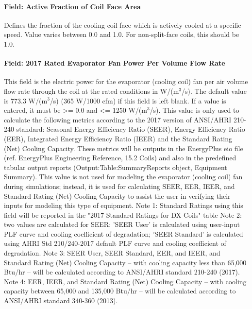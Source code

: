 \paragraph{Field: Active Fraction of Coil Face Area}\label{field-active-fraction-of-coil-face-area}

Defines the fraction of the cooling coil face which is actively cooled at a specific speed. Value varies between 0.0 and 1.0. For non-split-face coils, this should be 1.0.

\paragraph{Field: 2017 Rated Evaporator Fan Power Per Volume Flow Rate}

This field is the electric power for the evaporator (cooling coil) fan per air volume flow rate through the coil at the rated conditions in W/(m\(^{3}\)/s). The default value is 773.3 W/(m\(^{3}\)/s) (365 W/1000 cfm) if this field is left blank. If a value is entered, it must be \textgreater{}= 0.0 and \textless{}= 1250 W/(m\(^{3}\)/s). This value is only used to calculate the following metrics according to the 2017 version of ANSI/AHRI 210-240 standard: Seasonal Energy Efficiency Ratio (SEER), Energy Efficiency Ratio (EER), Integrated Energy Efficiency Ratio (IEER) and the Standard Rating (Net) Cooling Capacity.  These metrics will be outputs in the EnergyPlus eio file (ref. EnergyPlus Engineering Reference, 15.2 Coils) and also in the predefined tabular output reports (Output:Table:SummaryReports object, Equipment Summary). This value is not used for modeling the evaporator (cooling coil) fan during simulations; instead, it is used for calculating SEER, EER, IEER, and Standard Rating (Net) Cooling Capacity to assist the user in verifying their inputs for modeling this type of equipment. 
Note 1: Standard Ratings using this field will be reported in the "2017 Standard Ratings for DX Coils" table
Note 2: two values are calculated for SEER: 'SEER User' is calculated using user-input PLF curve and cooling coefficient of degradation; 'SEER Standard' is calculated using AHRI Std 210/240-2017 default PLF curve and cooling coefficient of degradation.
Note 3: SEER User, SEER Standard, EER, and IEER, and Standard Rating (Net) Cooling Capacity -- with cooling capacity less than 65,000 Btu/hr -- will be calculated according to ANSI/AHRI standard 210-240 (2017).
Note 4: EER, IEER, and Standard Rating (Net) Cooling Capacity -- with cooling capacity between 65,000 and 135,000 Btu/hr -- will be calculated according to ANSI/AHRI standard 340-360 (2013).

